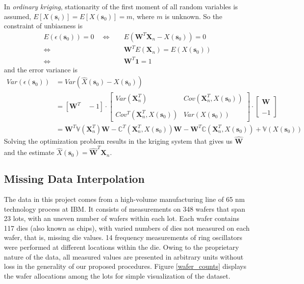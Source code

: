 \documentclass[12pt]{article}
\numberwithin{equation}{section}
\numberwithin{table}{section}
\numberwithin{figure}{section}
\newcommand{\bms}{\bm{s}}
\begin{document}
In \emph{ordinary kriging}, stationarity of the first moment of
all random variables is assumed, $ E[X(\bms_i)] = E[X(\bms_0)] = m$,
where $m$ is unknown. So the constraint of unbiasness is 
\begin{equation} \label{unbias}
\begin{split}
  E(\epsilon(\bms_0)) = 0 \quad 
  \Leftrightarrow \quad &E(\bm{W}^T\bm{X}_n - X(\bms_0)) = 0 \\
  \Leftrightarrow \quad &\bm{W}^TE(\bm{X}_n) = E(X(\bms_0)) \\
  \Leftrightarrow \quad &\bm{W}^T\bm{1} = 1
\end{split}
\end{equation}
and the error variance is
\begin{equation} \label{varerr}
\begin{split}
  Var(\epsilon(\bms_0)) &= Var(\hat{X}(\bms_0) - X(\bms_0)) \\
  &=[\bm{W}^T \quad -1] \cdot 
  \begin{bmatrix}
    Var(\bm{X}_n^T) &  Cov(\bm{X}_n^T,  X(\bms_0))\\
    \\
    Cov^T(\bm{X}_n^T,  X(\bms_0)) & Var(X(\bms_0))
  \end{bmatrix}
  \cdot \begin{bmatrix}
    \bm{W} \\
    \\
    -1
  \end{bmatrix} \\
 &=\bm{W}^T\mathbb{V}(\bm{X}_n^T)\bm{W} - \mathbb{C}^T(\bm{X}_n^T, X(\bms_0))\bm{W}
  - \bm{W}^T\mathbb{C}(\bm{X}_n^T, X(\bms_0)) + \mathbb{V}(X(\bms_0))
\end{split}
\end{equation}
Solving the optimization problem results in the kriging system that
gives us $\hat{\bm{W}}$ and the estimate $\hat{X}(\bms_0)=\hat{\bm{W}}^T\bm{X}_n$.


\subsection{Missing Data Interpolation} \label{nafit}

\hspace{12 pt}
The data in this project comes from a high-volume manufacturing line
of 65 nm technology process at IBM. It consists of measurements on 348
wafers that span 23 lots, with an uneven number of wafers within each
lot. Each wafer contains 117 dies (also known as chips), with varied
numbers of dies not measured on each wafer, that is, missing die
values. 14 frequency measurements of ring oscillators were performed
at different locations within the die. Owing to the proprietary nature
of the data, all measured values are presented in arbitrary units
without loss in the generality of our proposed procedures. 
Figure \ref{wafer_counts} displays the wafer allocations among the
lots for simple visualization of the dataset. 
\end{document}
